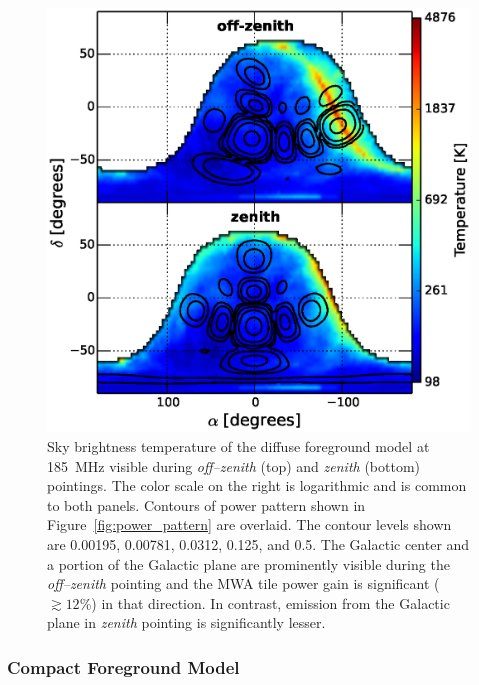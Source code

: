 \documentclass[preprint2,iop,numberedappendix]{emulateapj}
\begin{document}
\begin{figure}[htb]
\centering
\includegraphics[width=\linewidth]{fig6.eps}
\caption{Sky brightness temperature of the diffuse foreground model at 185~MHz visible during {\it off--zenith} (top) and {\it zenith} (bottom) pointings. The color scale on the right is logarithmic and is common to both panels. Contours of power pattern shown in Figure~\ref{fig:power_pattern} are overlaid. The contour levels shown are 0.00195, 0.00781, 0.0312, 0.125, and 0.5. The Galactic center and a portion of the Galactic plane are prominently visible during the {\it off--zenith} pointing and the MWA tile power gain is significant ($\gtrsim 12$\%) in that direction. In contrast, emission from the Galactic plane in {\it zenith} pointing is significantly lesser. \label{fig:DSM}}
\end{figure}

\subsubsection{Compact Foreground Model}\label{sec:CSM}
\end{document}
